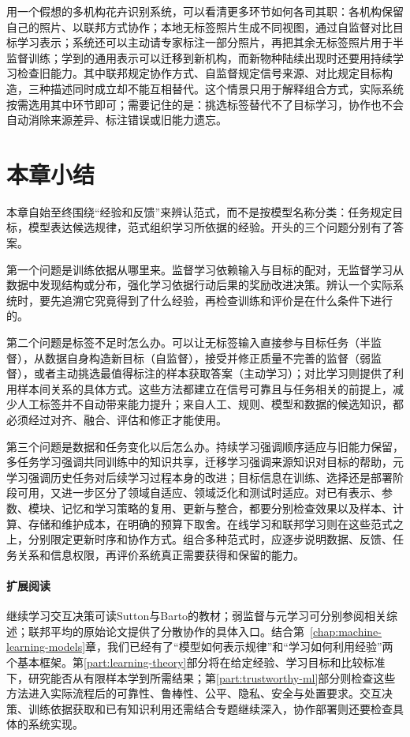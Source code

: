 用一个假想的多机构花卉识别系统，可以看清更多环节如何各司其职：各机构保留自己的照片、以联邦方式协作；本地无标签照片生成不同视图，通过自监督对比目标学习表示；系统还可以主动请专家标注一部分照片，再把其余无标签照片用于半监督训练；学到的通用表示可以迁移到新机构，而新物种陆续出现时还要用持续学习检查旧能力。其中联邦规定协作方式、自监督规定信号来源、对比规定目标构造，三种描述同时成立却不能互相替代。这个情景只用于解释组合方式，实际系统按需选用其中环节即可；需要记住的是：挑选标签替代不了目标学习，协作也不会自动消除来源差异、标注错误或旧能力遗忘。

\section{本章小结}
\label{sec:machine-learning-paradigms-summary}

本章自始至终围绕“经验和反馈”来辨认范式，而不是按模型名称分类：任务规定目标，模型表达候选规律，范式组织学习所依据的经验。开头的三个问题分别有了答案。

第一个问题是训练依据从哪里来。监督学习依赖输入与目标的配对，无监督学习从数据中发现结构或分布，强化学习依据行动后果的奖励改进决策。辨认一个实际系统时，要先追溯它究竟得到了什么经验，再检查训练和评价是在什么条件下进行的。

第二个问题是标签不足时怎么办。可以让无标签输入直接参与目标任务（半监督），从数据自身构造新目标（自监督），接受并修正质量不完善的监督（弱监督），或者主动挑选最值得标注的样本获取答案（主动学习）；对比学习则提供了利用样本间关系的具体方式。这些方法都建立在信号可靠且与任务相关的前提上，减少人工标签并不自动带来能力提升；来自人工、规则、模型和数据的候选知识，都必须经过对齐、融合、评估和修正才能使用。

第三个问题是数据和任务变化以后怎么办。持续学习强调顺序适应与旧能力保留，多任务学习强调共同训练中的知识共享，迁移学习强调来源知识对目标的帮助，元学习强调历史任务对后续学习过程本身的改进；目标信息在训练、选择还是部署阶段可用，又进一步区分了领域自适应、领域泛化和测试时适应。对已有表示、参数、模块、记忆和学习策略的复用、更新与整合，都要分别检查效果以及样本、计算、存储和维护成本，在明确的预算下取舍。在线学习和联邦学习则在这些范式之上，分别限定更新时序和协作方式。组合多种范式时，应逐步说明数据、反馈、任务关系和信息权限，再评价系统真正需要获得和保留的能力。

\paragraph{扩展阅读}

继续学习交互决策可读Sutton与Barto的教材；弱监督与元学习可分别参阅相关综述；联邦平均的原始论文提供了分散协作的具体入口。结合第~\ref{chap:machine-learning-models}章，我们已经有了“模型如何表示规律”和“学习如何利用经验”两个基本框架。第\ref{part:learning-theory}部分将在给定经验、学习目标和比较标准下，研究能否从有限样本学到所需结果；第\ref{part:trustworthy-ml}部分则检查这些方法进入实际流程后的可靠性、鲁棒性、公平、隐私、安全与处置要求。交互决策、训练依据获取和已有知识利用还需结合专题继续深入，协作部署则还要检查具体的系统实现。

